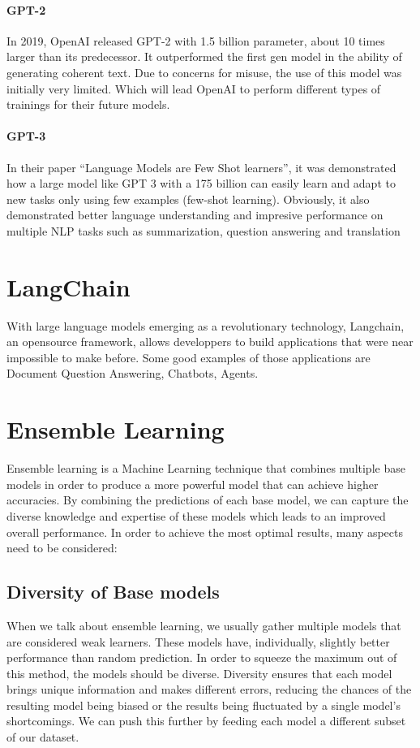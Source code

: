 \documentclass[a4paper,12pt,twoside]{report}
\begin{document}
\paragraph{GPT-2}
In 2019, OpenAI released GPT-2 with 1.5 billion parameter, about 10 times larger than its predecessor. It outperformed the first gen model in the ability of generating coherent text. Due to concerns for misuse, the use of this model was initially very limited. Which will lead OpenAI to perform different types of trainings for their future models.
\paragraph{GPT-3}
In their paper ``Language Models are Few Shot learners''\cite{brown2020language}, it was demonstrated how a large model like GPT 3 with a 175 billion can easily learn and adapt to new tasks only using few examples (few-shot learning). Obviously, it also demonstrated better language understanding and impresive performance on multiple NLP tasks such as summarization, question answering and translation
\section{LangChain}\label{langchainSec}
With large language models emerging as a revolutionary technology, Langchain\cite{langchain}, an opensource framework, allows developpers to build applications that were near impossible to make before. Some good examples of those applications are Document Question Answering, Chatbots, Agents.
\section{Ensemble Learning}
Ensemble learning is a Machine Learning technique that combines multiple base models in order to produce a more powerful model that can achieve higher accuracies. By combining the predictions of each base model, we can capture the diverse knowledge and expertise of these models which leads to an improved overall performance. In order to achieve the most optimal results, many aspects need to be considered:
\subsection{Diversity of Base models}
When we talk about ensemble learning, we usually gather multiple models that are considered weak learners. These models have, individually, slightly better performance than random prediction. In order to squeeze the maximum out of this method, the models should be diverse. Diversity ensures that each model brings unique information and makes different errors, reducing the chances of the resulting model being biased or the results being fluctuated by a single model's shortcomings. We can push this further by feeding each model a different subset of our dataset.
\end{document}
